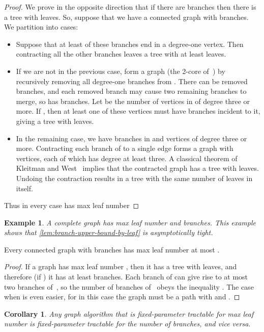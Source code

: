 \documentclass{jgaa-art}
\newtheorem{corollary}{Corollary}
\newtheorem{example}{Example}
\begin{document}
\begin{proof}
We prove in the opposite direction that if there are  branches then there is a tree with  leaves.
So, suppose that we have a connected graph  with  branches.
We partition into cases:
\begin{itemize}
\item Suppose that at least  of these branches end in a degree-one vertex.
Then contracting all the other branches leaves a tree with at least  leaves.
\item If we are not in the previous case, form a graph  (the 2-core of~) by recursively removing all degree-one branches from . There can be  removed branches, and each removed branch may cause two remaining branches to merge, so  has  branches. Let  be the number of vertices in  of degree three or more. If , then at least one of these vertices must have  branches incident to it, giving a tree with  leaves.
\item In the remaining case, we have  branches in  and  vertices of degree three or more. Contracting each branch of  to a single edge forms a graph with  vertices, each of which has degree at least three. A classical theorem of Kleitman and West~\cite{KleWes-SJDM-91} implies that the contracted graph has a tree with  leaves. Undoing the contraction results in a tree with the same number of leaves in  itself.
\end{itemize}
Thus in every case  has max leaf number 
\end{proof}

\begin{example}
A complete graph  has max leaf number  and   branches. This example shows that \autoref{lem:branch-upper-bound-by-leaf} is asymptotically tight.
\end{example} 

\begin{lemma}
\label{lem:leaf-upper-bound-by-branch}
Every connected graph with  branches has max leaf number at most .
\end{lemma}

\begin{proof}
If a graph  has max leaf number , then it has a tree  with  leaves, and therefore (if ) it has at least  branches. Each branch of  can give rise to at most two branches of~, so the number  of branches of~ obeys the inequality . The case when  is even easier, for  in this case the graph must be a path with  and .
\end{proof}

\begin{corollary}
\label{cor:equiv-params}
Any graph algorithm that is fixed-parameter tractable for max leaf number is fixed-parameter tractable for the number of branches, and vice versa.
\end{corollary}
\end{document}

